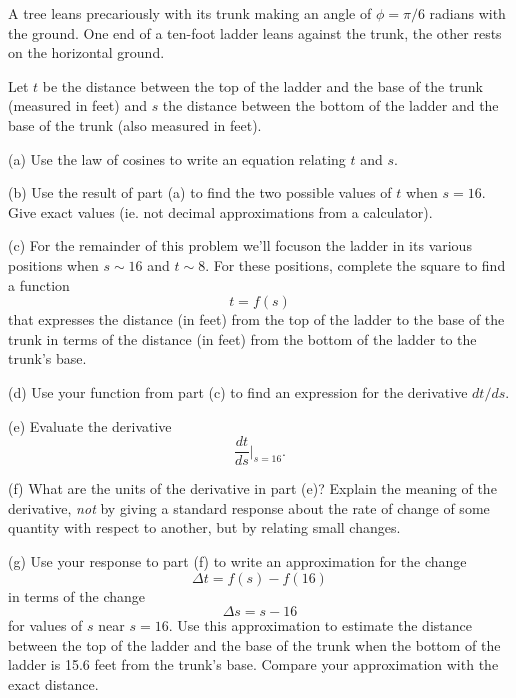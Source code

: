 \documentclass{ximera}
\begin{document}
\begin{question}  \label{Q:df0g43rb4}
A tree leans precariously with its trunk making an angle of $\phi = \pi/6$ radians with the ground. One end of a ten-foot ladder leans against the trunk, the other rests on the horizontal ground.

Let $t$ be the distance between the top of the ladder and the base of the trunk (measured in feet) and $s$ the distance between the bottom of the ladder and the base of the trunk (also measured in feet).

(a) Use the law of cosines to write an equation relating $t$ and $s$.

(b) Use the result of part (a) to find the two possible values of $t$ when $s=16$. Give exact values (ie. not decimal approximations from a calculator).

(c) For the remainder of this problem we'll focuson the ladder in its various positions when $s \sim 16$ and $t\sim 8$. For these positions, complete the square to find a function 
\[
    t = f(s)
\]
that expresses the distance (in feet) from the top of the ladder to the base of the trunk in terms of the distance (in feet) from the bottom of the ladder to the trunk's base.

(d) Use your function from part (c) to find an expression for the derivative $dt/ds$.

(e) Evaluate the derivative 
\[
       \frac{dt}{ds}\Big|_{s=16} .
\]

(f) What are the units of the derivative in part (e)? Explain the meaning of the derivative, \emph{not} by giving a standard response about the rate of change of some quantity with respect to another, but by relating small changes.

(g) Use your response to part (f) to write an approximation for the change
\[
         \Delta t = f(s) - f(16)
\]
in terms of the change 
\[
     \Delta s = s - 16
\]
for values of $s$ near $s=16$. Use this approximation to estimate the distance between the top of the ladder and the base of the trunk when the bottom of the ladder is 15.6  feet from the trunk’s base. Compare your approximation with the exact distance.
\end{question}
\end{document}
